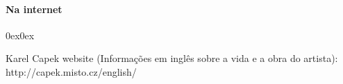 \documentclass[11pt]{hedrabook}
\begin{document}
\paragraph{Na internet}

\begin{description}0ex\parsep0ex
\newcommand{\tit}[1]{\item[\textnormal{\textsc{\MakeTextLowercase{#1}}}]}
\newcommand{\titidem}{\item[\line(1,0){25}]}

\tit{}Karel Capek website (Informações em inglês sobre a vida e a obra do artista):
http://capek.misto.cz/\hfil\break english/

\end{description}
\end{document}
